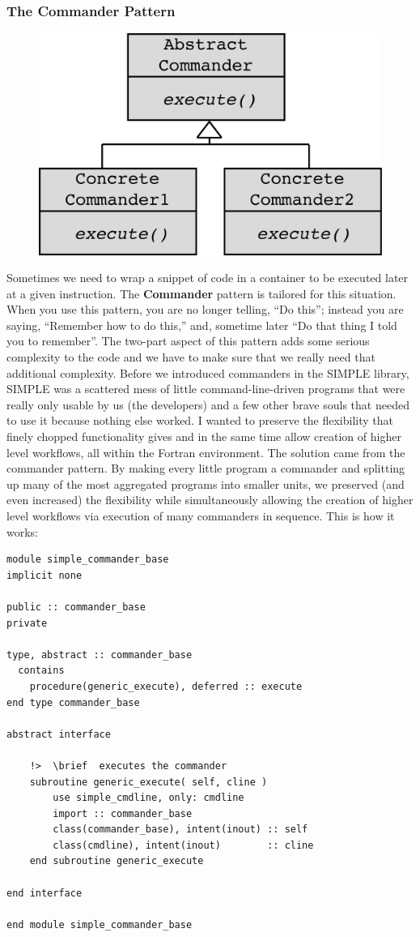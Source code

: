 \documentclass[a4paper,11pt]{article}
\begin{document}
\subsubsection{The Commander Pattern}
\begin{figure}
\includegraphics[keepaspectratio=true,scale=0.4]{./Commander/Commander}
\end{figure}
Sometimes we need to wrap a snippet of code in a container to be executed later at a given instruction. The \textbf{Commander} pattern is tailored for this situation. When you use this pattern, you are no longer telling, ``Do this''; instead you are saying, ``Remember how to do this,'' and, sometime later ``Do that thing I told you to remember''. The two-part aspect of this pattern adds some serious complexity to the code and we have to make sure that we really need that additional complexity. Before we introduced commanders in the SIMPLE library, SIMPLE was a scattered mess of little command-line-driven programs that were really only usable by us (the developers) and a few other brave souls that needed to use it because nothing else worked. I wanted to preserve the flexibility that finely chopped functionality gives and in the same time allow creation of higher level workflows, all within the Fortran environment. The solution came from the commander pattern. By making every little program a commander and splitting up many of the most aggregated programs into smaller units, we preserved (and even increased) the flexibility while simultaneously allowing the creation of higher level workflows via execution of many commanders in sequence. This is how it works:
\begin{verbatim}
module simple_commander_base
implicit none

public :: commander_base
private

type, abstract :: commander_base
  contains
    procedure(generic_execute), deferred :: execute
end type commander_base

abstract interface

    !>  \brief  executes the commander
    subroutine generic_execute( self, cline )
        use simple_cmdline, only: cmdline
        import :: commander_base
        class(commander_base), intent(inout) :: self
        class(cmdline), intent(inout)        :: cline
    end subroutine generic_execute

end interface

end module simple_commander_base
\end{verbatim}
\end{document}
